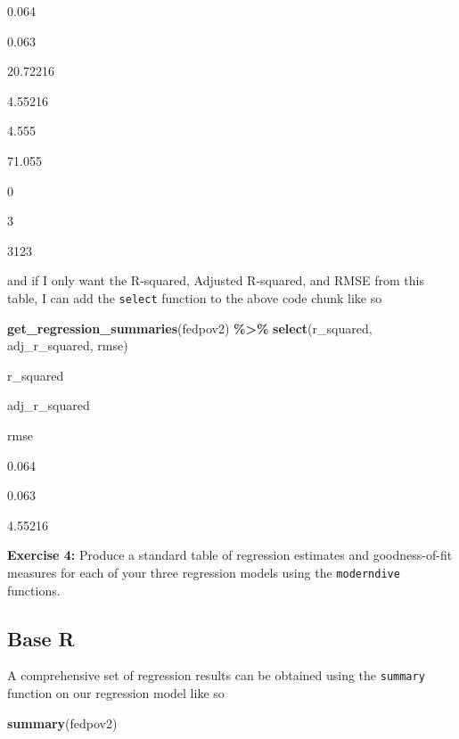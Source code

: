 \documentclass[
]{book}
\makeatletter
\newenvironment{Shaded}{\begin{snugshade}}{\end{snugshade}}
\newcommand{\FunctionTok}[1]{\textcolor[rgb]{0.27,0.27,0.27}{\textbf{#1}}}
\newcommand{\NormalTok}[1]{#1}
\newcommand{\SpecialCharTok}[1]{\textcolor[rgb]{0.43,0.43,0.43}{\textbf{#1}}}
\newenvironment{kframe}{%
\medskip{}
\setlength{\fboxsep}{.8em}
 \def\at@end@of@kframe{}%
 \ifinner\ifhmode%
  \def\at@end@of@kframe{\end{minipage}}%
  \begin{minipage}{\columnwidth}%
 \fi\fi%
 \def\FrameCommand##1{\hskip\@totalleftmargin \hskip-\fboxsep
 \colorbox{shadecolor}{##1}\hskip-\fboxsep
     \hskip-\linewidth \hskip-\@totalleftmargin \hskip\columnwidth}%
 \MakeFramed {\advance\hsize-\width
   \@totalleftmargin\z@ \linewidth\hsize
   \@setminipage}}%
 {\par\unskip\endMakeFramed%
 \at@end@of@kframe}
\renewenvironment{Shaded}{\begin{kframe}}{\end{kframe}}
\newenvironment{rmdblock}[1]
  {\begin{shaded*}
  }
  {\end{shaded*}
  }
\newenvironment{learncheck}
  {\begin{rmdblock}{warning}}
  {\end{rmdblock}}
\makeatother
\begin{document}
0.064

0.063

20.72216

4.55216

4.555

71.055

0

3

3123

and if I only want the R-squared, Adjusted R-squared, and RMSE from this table, I can add the \texttt{select} function to the above code chunk like so

\begin{Shaded}
\begin{Highlighting}[]
\FunctionTok{get\_regression\_summaries}\NormalTok{(fedpov2) }\SpecialCharTok{\%\textgreater{}\%} 
  \FunctionTok{select}\NormalTok{(r\_squared, adj\_r\_squared, rmse)}
\end{Highlighting}
\end{Shaded}

r\_squared

adj\_r\_squared

rmse

0.064

0.063

4.55216

\begin{learncheck}
\textbf{Exercise 4:} Produce a standard table of regression estimates
and goodness-of-fit measures for each of your three regression models
using the \texttt{moderndive} functions.
\end{learncheck}

\hypertarget{base-r}{%
\subsection{Base R}\label{base-r}}

A comprehensive set of regression results can be obtained using the \texttt{summary} function on our regression model like so

\begin{Shaded}
\begin{Highlighting}[]
\FunctionTok{summary}\NormalTok{(fedpov2)}
\end{Highlighting}
\end{Shaded}
\end{document}
